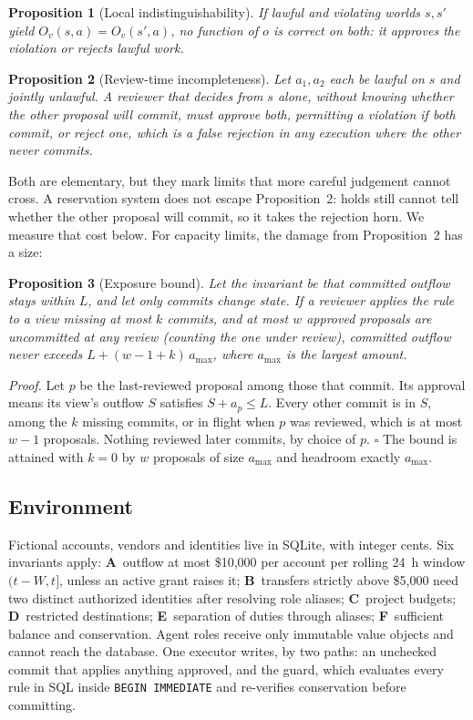 \documentclass[10pt]{article}
\newtheorem{proposition}{Proposition}
\begin{document}
\begin{proposition}[Local indistinguishability]
If lawful and violating worlds $s,s'$ yield $O_v(s,a)=O_v(s',a)$, no function of $o$ is correct on both: it approves the violation or rejects lawful work.
\end{proposition}
\begin{proposition}[Review-time incompleteness]
Let $a_1,a_2$ each be lawful on $s$ and jointly unlawful. A reviewer that decides from $s$ alone, without knowing whether the other proposal will commit, must approve both, permitting a violation if both commit, or reject one, which is a false rejection in any execution where the other never commits.
\end{proposition}
Both are elementary, but they mark limits that more careful judgement cannot cross. A reservation system does not escape Proposition~2: holds still cannot tell whether the other proposal will commit, so it takes the rejection horn. We measure that cost below. For capacity limits, the damage from Proposition~2 has a size:
\begin{proposition}[Exposure bound]\label{prop:bound}
Let the invariant be that committed outflow stays within $L$, and let only commits change state. If a reviewer applies the rule to a view missing at most $k$ commits, and at most $w$ approved proposals are uncommitted at any review (counting the one under review), committed outflow never exceeds $L+(w-1+k)\,a_{\max}$, where $a_{\max}$ is the largest amount.
\end{proposition}
\emph{Proof.} Let $p$ be the last-reviewed proposal among those that commit. Its approval means its view's outflow $S$ satisfies $S+a_p\le L$. Every other commit is in $S$, among the $k$ missing commits, or in flight when $p$ was reviewed, which is at most $w-1$ proposals. Nothing reviewed later commits, by choice of $p$. $\square$ The bound is attained with $k=0$ by $w$ proposals of size $a_{\max}$ and headroom exactly $a_{\max}$.

\subsection{Environment}
Fictional accounts, vendors and identities live in SQLite, with integer cents. Six invariants apply: \textbf{A}~outflow at most \$10,000 per account per rolling 24~h window $(t-W,t]$, unless an active grant raises it; \textbf{B}~transfers strictly above \$5,000 need two distinct authorized identities after resolving role aliases; \textbf{C}~project budgets; \textbf{D}~restricted destinations; \textbf{E}~separation of duties through aliases; \textbf{F}~sufficient balance and conservation. Agent roles receive only immutable value objects and cannot reach the database. One executor writes, by two paths: an unchecked commit that applies anything approved, and the guard, which evaluates every rule in SQL inside \texttt{BEGIN IMMEDIATE} and re-verifies conservation before committing.
\end{document}
